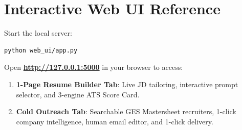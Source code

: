 \documentclass[11pt,a4paper]{article}
\begin{document}
\vspace{8pt}

\section{Interactive Web UI Reference}
Start the local server:
\begin{verbatim}
python web_ui/app.py
\end{verbatim}
Open \textbf{\url{http://127.0.0.1:5000}} in your browser to access:
\begin{enumerate}[leftmargin=18pt, itemsep=2pt]
    \item \textbf{1-Page Resume Builder Tab}: Live JD tailoring, interactive prompt selector, and 3-engine ATS Score Card.
    \item \textbf{Cold Outreach Tab}: Searchable GES Mastersheet recruiters, 1-click company intelligence, human email editor, and 1-click delivery.
\end{enumerate}
\end{document}
